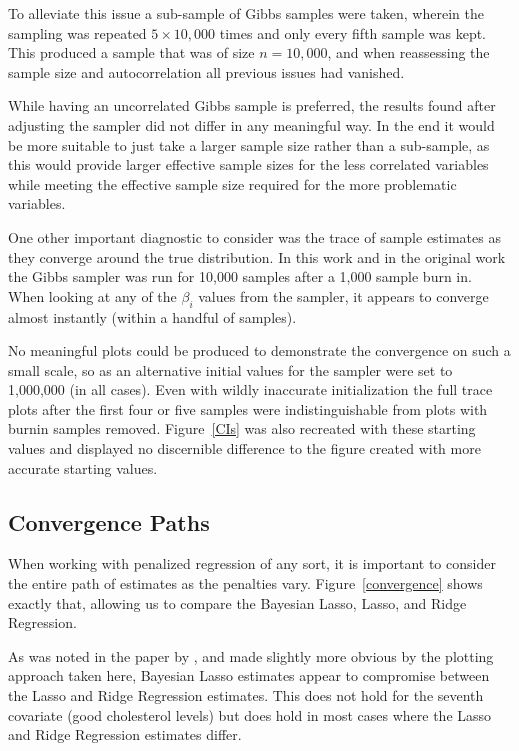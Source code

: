 \documentclass{uwstat572}
\begin{document}
To alleviate this issue a sub-sample of Gibbs samples were taken, wherein the sampling was repeated $5 \times 10,000$ times and only every fifth sample was kept. This produced a sample that was of size $n=10,000$, and when reassessing the sample size and autocorrelation all previous issues had vanished.

While having an uncorrelated Gibbs sample is preferred, the results found after adjusting the sampler did not differ in any meaningful way. In the end it would be more suitable to just take a larger sample size rather than a sub-sample, as this would provide larger effective sample sizes for the less correlated variables while meeting the effective sample size required for the more problematic variables.

One other important diagnostic to consider was the trace of sample estimates as they converge around the true distribution. In this work and in the original work the Gibbs sampler was run for 10,000 samples after a 1,000 sample burn in. When looking at any of the $\beta_i$ values from the sampler, it appears to converge almost instantly (within a handful of samples). 

No meaningful plots could be produced to demonstrate the convergence on such a small scale, so as an alternative initial values for the sampler were set to 1,000,000 (in all cases). Even with wildly inaccurate initialization the full trace plots after the first four or five samples were indistinguishable from plots with burnin samples removed. Figure~\ref{CIs} was also recreated with these starting values and displayed no discernible difference to the figure created with more accurate starting values.

\subsection{Convergence Paths}
When working with penalized regression of any sort, it is important to consider the entire path of estimates as the penalties vary. Figure~\ref{convergence} shows exactly that, allowing us to compare the Bayesian Lasso, Lasso, and Ridge Regression. 

As was noted in the paper by \cite{park2008bayesian}, and made slightly more obvious by the plotting approach taken here, Bayesian Lasso estimates appear to compromise between the Lasso and Ridge Regression estimates. This does not hold for the seventh covariate (good cholesterol levels) but does hold in most cases where the Lasso and Ridge Regression estimates differ.
\end{document}
